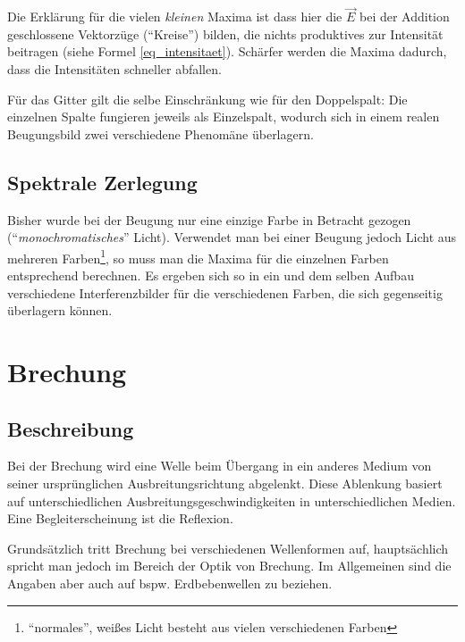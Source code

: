 Die Erklärung für die vielen \emph{kleinen} Maxima ist dass hier die \(\vec{E}\) bei der Addition geschlossene Vektorzüge ("`Kreise"') bilden, die nichts produktives zur Intensität beitragen (siehe Formel \ref{eq_intensitaet}). Schärfer werden die Maxima dadurch, dass die Intensitäten schneller abfallen.


Für das Gitter gilt die selbe Einschränkung wie für den Doppelspalt: Die einzelnen Spalte fungieren jeweils als Einzelspalt, wodurch sich in einem realen Beugungsbild zwei verschiedene Phenomäne überlagern.







	\section{Spektrale Zerlegung}

Bisher wurde bei der Beugung nur eine einzige Farbe in Betracht gezogen ("`\textit{monochromatisches}"' Licht). Verwendet man bei einer Beugung jedoch Licht aus mehreren Farben\footnote{"`normales"', weißes Licht besteht aus vielen verschiedenen Farben}, so muss man die Maxima für die einzelnen Farben entsprechend berechnen. Es ergeben sich so in ein und dem selben Aufbau verschiedene Interferenzbilder für die verschiedenen Farben, die sich gegenseitig überlagern können.








		\chapter{Brechung}

	\section{Beschreibung}

Bei der Brechung wird eine Welle beim Übergang in ein anderes Medium von seiner ursprünglichen Ausbreitungsrichtung abgelenkt. Diese Ablenkung basiert auf unterschiedlichen Ausbreitungsgeschwindigkeiten in unterschiedlichen Medien. Eine Begleiterscheinung ist die Reflexion.

Grundsätzlich tritt Brechung bei verschiedenen Wellenformen auf, hauptsächlich spricht man jedoch im Bereich der Optik von Brechung. Im Allgemeinen sind die Angaben aber auch auf bspw. Erdbebenwellen zu beziehen.

